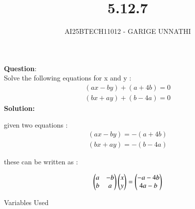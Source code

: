 \documentclass[journal]{IEEEtran}
\begin{document}

\vspace{3cm}

\title{5.12.7}
\author{AI25BTECH11012 - GARIGE UNNATHI}
{\let\newpage\relax\maketitle}


\renewcommand{\thefigure}{\theenumi}
\renewcommand{\thetable}{\theenumi}
\setlength{\intextsep}{10pt} %


\renewcommand{\thetable}{\theenumi}


\textbf{Question}:\\
 Solve the following equations for x and y :
 \begin{align*}
     (ax - by) + (a + 4b)= 0 \\
     (bx + ay) + (b - 4a)= 0
 \end{align*}
\textbf{Solution: }

given two equations :
 \begin{align}
     (ax - by) =  -(a + 4b) \\
     (bx + ay) = -(b - 4a)
 \end{align}

 these can be written as :

 \begin{align}
     \begin{pmatrix}a & -b \\ b & a\end{pmatrix}\begin{pmatrix}x \\ y\end{pmatrix} = \begin{pmatrix}-a-4b \\ 4a -b\end{pmatrix}
 \end{align}

 \begin{table}[h!]    
      \centering
      
      \caption{Variables Used}
      \label{}
    \end{table}
\end{document}
